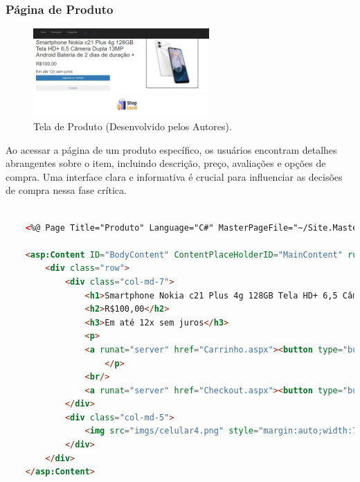 \documentclass[
	12pt,				%
	openright,			%
	twoside,			%
	a4paper,			%
	english,			%
	brazil				%
	]{abntex2}
\begin{document}
\subsubsection{Página de Produto}

\begin{figure}[htb]
    \centering
    \includegraphics[width=0.6\textwidth]{img/product-desktop-print.jpg}
    \caption{Tela de Produto (Desenvolvido pelos Autores).}
    \label{fig:tela-de-produto-desktop}
\end{figure}

Ao acessar a página de um produto específico, os usuários encontram detalhes abrangentes sobre o item, incluindo descrição, preço, avaliações e opções de compra. Uma interface clara e informativa é crucial para influenciar as decisões de compra nessa fase crítica.

\begin{lstlisting}[language=HTML, caption=Tela de Produto em ASPX, label=lst:aspx]

	<%@ Page Title="Produto" Language="C#" MasterPageFile="~/Site.Master" AutoEventWireup="true" CodeBehind="Produto.aspx.cs" Inherits="UNIPPIMVIII.Produto" %>

	<asp:Content ID="BodyContent" ContentPlaceHolderID="MainContent" runat="server">
		<div class="row">
			<div class="col-md-7">
				<h1>Smartphone Nokia c21 Plus 4g 128GB Tela HD+ 6,5 Câmera Dupla 13MP Android Bateria de 2 dias de duração +</h1>
				<h2>R$100,00</h2>
				<h3>Em até 12x sem juros</h3>
				<p>
				<a runat="server" href="Carrinho.aspx"><button type="button" class="btn btn-primary" style="margin:auto;width:70%;height:auto;">Adicionar ao Carrinho</button></a>
					</p>
				<br/>
				<a runat="server" href="Checkout.aspx"><button type="button" class="btn btn-light" style="margin:auto;width:70%;height:auto;">Comprar</button></a>
			</div>
			<div class="col-md-5">
				<img src="imgs/celular4.png" style="margin:auto;width:70%;height:auto;border:2px solid black" />
			</div>
		</div>
	</asp:Content>
	

\end{lstlisting}
\end{document}
